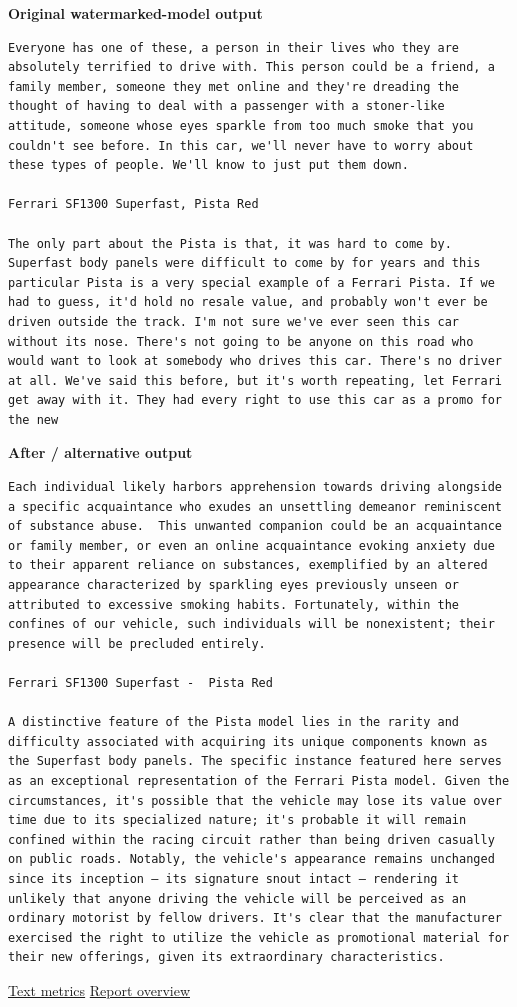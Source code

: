 \textbf{Original watermarked-model output}

\begin{Verbatim}
Everyone has one of these, a person in their lives who they are absolutely terrified to drive with. This person could be a friend, a family member, someone they met online and they're dreading the thought of having to deal with a passenger with a stoner-like attitude, someone whose eyes sparkle from too much smoke that you couldn't see before. In this car, we'll never have to worry about these types of people. We'll know to just put them down.

Ferrari SF1300 Superfast, Pista Red

The only part about the Pista is that, it was hard to come by. Superfast body panels were difficult to come by for years and this particular Pista is a very special example of a Ferrari Pista. If we had to guess, it'd hold no resale value, and probably won't ever be driven outside the track. I'm not sure we've ever seen this car without its nose. There's not going to be anyone on this road who would want to look at somebody who drives this car. There's no driver at all. We've said this before, but it's worth repeating, let Ferrari get away with it. They had every right to use this car as a promo for the new
\end{Verbatim}

\textbf{After / alternative output}

\begin{Verbatim}
Each individual likely harbors apprehension towards driving alongside a specific acquaintance who exudes an unsettling demeanor reminiscent of substance abuse.  This unwanted companion could be an acquaintance or family member, or even an online acquaintance evoking anxiety due to their apparent reliance on substances, exemplified by an altered appearance characterized by sparkling eyes previously unseen or attributed to excessive smoking habits. Fortunately, within the confines of our vehicle, such individuals will be nonexistent; their presence will be precluded entirely.

Ferrari SF1300 Superfast -  Pista Red

A distinctive feature of the Pista model lies in the rarity and difficulty associated with acquiring its unique components known as the Superfast body panels. The specific instance featured here serves as an exceptional representation of the Ferrari Pista model. Given the circumstances, it's possible that the vehicle may lose its value over time due to its specialized nature; it's probable it will remain confined within the racing circuit rather than being driven casually on public roads. Notably, the vehicle's appearance remains unchanged since its inception – its signature snout intact – rendering it unlikely that anyone driving the vehicle will be perceived as an ordinary motorist by fellow drivers. It's clear that the manufacturer exercised the right to utilize the vehicle as promotional material for their new offerings, given its extraordinary characteristics.
\end{Verbatim}

\href{records/docs/watermarking/text.tex}{Text metrics} \textbar{}
\href{../docs/watermarking/README.md}{Report overview}
